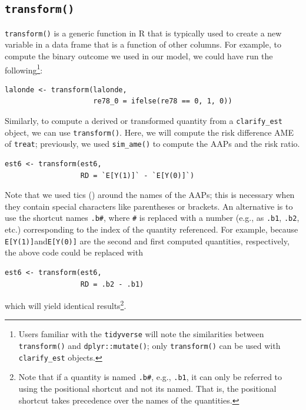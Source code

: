 \subsection{\texorpdfstring{\texttt{transform()}}{transform()}}\label{transform}

\texttt{transform()} is a generic function in R that is typically used to create a new variable in a data frame that is a function of other columns. For example, to compute the binary outcome we used in our model, we could have run the following\footnote{Users familiar with the \texttt{tidyverse} will note the similarities between \texttt{transform()} and \texttt{dplyr::mutate()}; only \texttt{transform()} can be used with \texttt{clarify\_est} objects.}:

\begin{verbatim}
lalonde <- transform(lalonde,
                     re78_0 = ifelse(re78 == 0, 1, 0))
\end{verbatim}

Similarly, to compute a derived or transformed quantity from a \texttt{clarify\_est} object, we can use \texttt{transform()}. Here, we will compute the risk difference AME of \texttt{treat}; previously, we used \texttt{sim\_ame()} to compute the AAPs and the risk ratio.

\begin{verbatim}
est6 <- transform(est6,
                  RD = `E[Y(1)]` - `E[Y(0)]`)
\end{verbatim}

Note that we used tics (\texttt{\textasciigrave{}}) around the names of the AAPs; this is necessary when they contain special characters like parentheses or brackets. An alternative is to use the shortcut names \texttt{.b\#}, where \texttt{\#} is replaced with a number (e.g., as \texttt{.b1}, \texttt{.b2}, etc.) corresponding to the index of the quantity referenced. For example, because \texttt{E{[}Y(1){]}}and\texttt{E{[}Y(0){]}} are the second and first computed quantities, respectively, the above code could be replaced with

\begin{verbatim}
est6 <- transform(est6,
                  RD = .b2 - .b1)
\end{verbatim}

which will yield identical results\footnote{Note that if a quantity is named \texttt{.b\#}, e.g., \texttt{.b1}, it can only be referred to using the positional shortcut and not its named. That is, the positional shortcut takes precedence over the names of the quantities.}.

